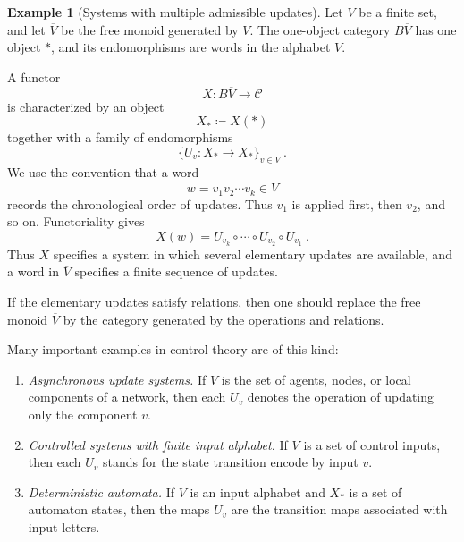 \documentclass[a4paper,reqno,oneside]{amsart}
\theoremstyle{definition}
\newtheorem{example}[theorem]{Example}
\theoremstyle{remark}
\numberwithin{equation}{section}
\begin{document}
	\begin{example}[Systems with multiple admissible updates]\label{ex: multiple admissible updates}
		Let $V$ be a finite set, and let $\overline V$ be the free monoid generated
		by $V$. The one-object category $B\overline V$ has one object $*$, and its
		endomorphisms are words in the alphabet $V$.
		
		A functor
		\begin{equation}
			X\colon B\overline V\to\mathcal C
		\end{equation}
		is characterized by an object
		\begin{equation}
			X_*\coloneqq X(*)
		\end{equation}
		together with a family of endomorphisms
		\begin{equation}
			\{U_v\colon X_*\longrightarrow X_*\}_{v\in V} \ .
		\end{equation}
		We use the convention that a word
		\begin{equation}
			w=v_1v_2\cdots v_k\in\overline V
		\end{equation}
		records the chronological order of updates. Thus $v_1$ is applied first,
		then $v_2$, and so on. Functoriality gives
		\begin{equation}
			X(w)
			=
			U_{v_k}\circ\cdots\circ U_{v_2}\circ U_{v_1} \ .
		\end{equation}
		Thus $X$ specifies a system in which several elementary updates are
		available, and a word in $\overline V$ specifies a finite sequence of
		updates.
		
		If the elementary updates satisfy relations, then one should replace the
		free monoid $\overline V$ by the category generated by the operations and relations.
		
		Many important examples in control theory are of this kind:
		\begin{enumerate}
			\item \textit{Asynchronous update systems.}
			If $V$ is the set of agents, nodes, or local components of a network, then each
			$U_v$ denotes the operation of updating only the component $v$.
			
			\item \textit{Controlled systems with finite input alphabet.}
			If $V$ is a set of control inputs, then each $U_v$ stands for the state transition encode by input $v$.
			
			\item \textit{Deterministic automata.}
			If $V$ is an input alphabet and $X_*$ is a set of automaton states, then
			the maps $U_v$ are the transition maps associated with input letters.
		\end{enumerate}
	\end{example}
	
\end{document}
